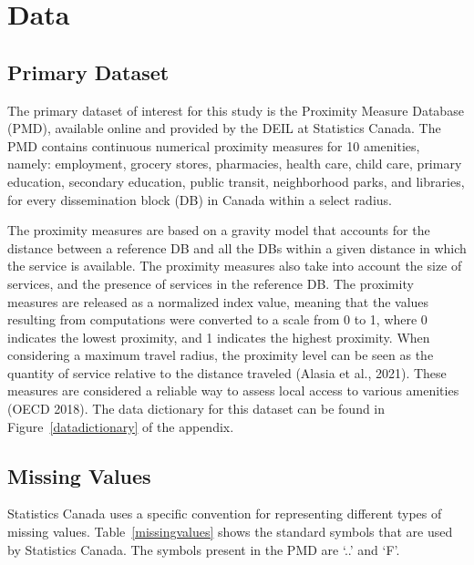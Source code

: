 \documentclass[11pt, a4paper]{article}
\begin{document}
\pagebreak 
\section{Data}




\subsection{Primary Dataset}

The primary dataset of interest for this study is the Proximity Measure Database (PMD), available online and provided by the DEIL at Statistics Canada. The PMD contains continuous numerical proximity measures for 10 amenities, namely: employment, grocery stores, pharmacies, health care, child care, primary education, secondary education, public transit, neighborhood parks, and libraries, for every dissemination block (DB) in Canada within a select radius.
\par
The proximity measures are based on a gravity model that accounts for the distance between a reference DB and all the DBs within a given distance in which the service is available. The proximity measures also take into account the size of services, and the presence of services in the reference DB. The proximity measures are released as a normalized index value, meaning that the values resulting from computations were converted to a scale from 0 to 1, where 0 indicates the lowest proximity, and 1 indicates the highest proximity. When considering a maximum travel radius, the proximity level can be seen as the quantity of service relative to the distance traveled (Alasia et al., 2021). These measures are considered a reliable way to assess local access to various amenities (OECD 2018). The data dictionary for this dataset can be found in Figure~\ref{datadictionary} of the appendix.







\subsection{Missing Values}


Statistics Canada uses a specific convention for representing different types of missing values. Table~\ref{missingvalues} shows the standard symbols that are used by Statistics Canada. The symbols present in the PMD are `..' and `F'.
\end{document}
